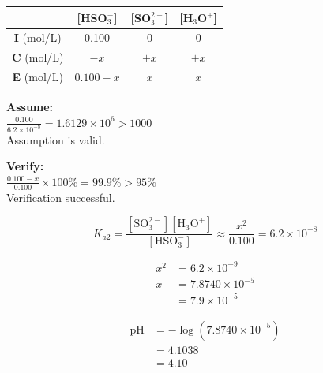\documentclass{article}
\begin{document}
\begin{table}[h!]
    \centering
    \renewcommand{\arraystretch}{2.0}
    \begin{tabular}{|c|c|c|c|}
        \hline
        & [HSO$_3^-$] & [SO$_3^{2-}$] & [H$_3$O$^+$] \\
        \hline
        \textbf{I} (mol/L) & 0.100 & 0 & 0 \\
        \hline
        \textbf{C} (mol/L) & $-x$ & $+x$ & $+x$ \\
        \hline
        \textbf{E} (mol/L) & $0.100-x$ & $x$ & $x$ \\
        \hline
    \end{tabular}
\end{table}

\noindent
\begin{minipage}[t]{0.45\textwidth}
    \textbf{Assume:} \\
    $\frac{0.100}{6.2 \times 10^{-8}} = 1.6129 \times 10^{6} > 1000$ \\
    Assumption is valid.
\end{minipage}
\hfill
\begin{minipage}[t]{0.45\textwidth}
    \textbf{Verify:} \\
    $\frac{0.100 - x}{0.100} \times 100\% = 99.9\% > 95\%$ \\
    Verification successful.
\end{minipage}

\begin{equation*}
K_{a2} = \frac{[\text{SO}_3^{2-}][\text{H}_3\text{O}^+]}{[\text{HSO}_3^-]} \approx \frac{x^2}{0.100} = 6.2 \times 10^{-8}
\end{equation*}

\noindent
\begin{minipage}[t]{0.45\textwidth}
    \begin{align*}
        x^2 &= 6.2 \times 10^{-9} \\
        x &= 7.8740 \times 10^{-5} \\
        &= 7.9 \times 10^{-5}
    \end{align*}
\end{minipage}
\hfill
\begin{minipage}[t]{0.45\textwidth}
    \begin{align*}
        \text{pH} &= -\log(7.8740 \times 10^{-5}) \\
        &= 4.1038 \\
        &= 4.10
    \end{align*}
\end{minipage}
\end{document}
